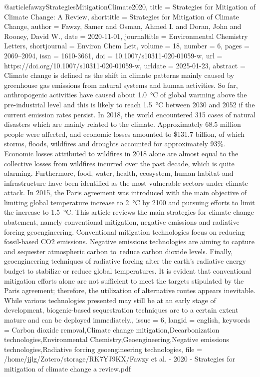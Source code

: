 {{{@article{fawzyStrategiesMitigationClimate2020,
  title = {Strategies for Mitigation of Climate Change: A Review},
  shorttitle = {Strategies for Mitigation of Climate Change},
  author = {Fawzy, Samer and Osman, Ahmed I. and Doran, John and Rooney, David W.},
  date = {2020-11-01},
  journaltitle = {Environmental Chemistry Letters},
  shortjournal = {Environ Chem Lett},
  volume = {18},
  number = {6},
  pages = {2069--2094},
  issn = {1610-3661},
  doi = {10.1007/s10311-020-01059-w},
  url = {https://doi.org/10.1007/s10311-020-01059-w},
  urldate = {2025-01-23},
  abstract = {Climate change is defined as the shift in climate patterns mainly caused by greenhouse gas emissions from natural systems and human activities. So far, anthropogenic activities have caused about 1.0~°C of global warming above the pre-industrial level and this is likely to reach 1.5~°C between 2030 and 2052 if the current emission rates persist. In 2018, the world encountered 315 cases of natural disasters which are mainly related to the climate. Approximately 68.5 million people were affected, and economic losses amounted to \$131.7 billion, of which storms, floods, wildfires and droughts accounted for approximately 93\%. Economic losses attributed to wildfires in 2018 alone are almost equal to the collective losses from wildfires incurred over the past decade, which is quite alarming. Furthermore, food, water, health, ecosystem, human habitat and infrastructure have been identified as the most vulnerable sectors under climate attack. In 2015, the Paris agreement was introduced with the main objective of limiting global temperature increase to 2~°C by 2100 and pursuing efforts to limit the increase to 1.5~°C. This article reviews the main strategies for climate change abatement, namely conventional mitigation, negative emissions and radiative forcing geoengineering. Conventional mitigation technologies focus on reducing fossil-based CO2 emissions. Negative emissions technologies are aiming to capture and sequester atmospheric carbon to~reduce carbon dioxide levels. Finally, geoengineering techniques of radiative forcing alter the earth’s radiative energy budget to stabilize or reduce global temperatures. It is evident that conventional mitigation efforts alone are not sufficient to meet the targets stipulated by the Paris agreement; therefore, the utilization of alternative routes appears inevitable. While various technologies presented may still be at an early stage of development, biogenic-based sequestration techniques are to a certain extent mature and can be deployed immediately.},
  issue = {6},
  langid = {english},
  keywords = {Carbon dioxide removal,Climate change mitigation,Decarbonization technologies,Environmental Chemistry,Geoengineering,Negative emissions technologies,Radiative forcing geoengineering technologies},
  file = {/home/jjlg/Zotero/storage/RK7YJ9KX/Fawzy et al. - 2020 - Strategies for mitigation of climate change a review.pdf}
}

}}}
